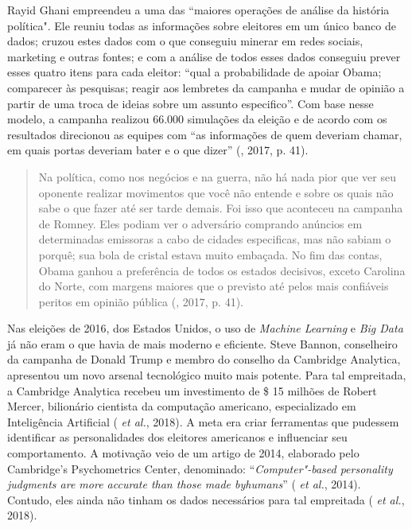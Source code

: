 Rayid Ghani empreendeu a uma das ``maiores operações de análise da
história política". Ele reuniu todas as informações sobre eleitores em
um único banco de dados; cruzou estes dados com o que conseguiu minerar
em redes sociais, marketing e outras fontes; e com a análise de todos
esses dados conseguiu prever esses quatro itens para cada eleitor:
``qual a probabilidade de apoiar Obama; comparecer às pesquisas; reagir
aos lembretes da campanha e mudar de opinião a partir de uma troca de
ideias sobre um assunto especifico''. Com base nesse modelo, a campanha
realizou 66.000 simulações da eleição e de acordo com os resultados
direcionou as equipes com ``as informações de quem deveriam chamar, em
quais portas deveriam bater e o que dizer'' (, 2017, p. 41).

\begin{quote}
Na política, como nos negócios e na guerra, não há nada pior que ver seu
oponente realizar movimentos que você não entende e sobre os quais não
sabe o que fazer até ser tarde demais. Foi isso que aconteceu na
campanha de Romney. Eles podiam ver o adversário comprando anúncios em
determinadas emissoras a cabo de cidades especificas, mas não sabiam o
porquê; sua bola de cristal estava muito embaçada. No fim das contas,
Obama ganhou a preferência de todos os estados decisivos, exceto
Carolina do Norte, com margens maiores que o previsto até pelos mais
confiáveis peritos em opinião pública (, 2017, p. 41).
\end{quote}

Nas eleições de 2016, dos Estados Unidos, o uso de \emph{Machine
Learning} e \emph{Big Data} já não eram o que havia de mais moderno e
eficiente. Steve Bannon, conselheiro da campanha de Donald Trump e
membro do conselho da Cambridge Analytica, apresentou um novo arsenal
tecnológico muito mais potente. Para tal empreitada, a Cambridge
Analytica recebeu um investimento de \$ 15 milhões de Robert Mercer,
bilionário cientista da computação americano, especializado em
Inteligência Artificial ( \emph{et al.}, 2018). A meta era criar
ferramentas que pudessem identificar as personalidades dos eleitores
americanos e influenciar seu comportamento. A motivação veio de um
artigo de 2014, elaborado pelo Cambridge's Psychometrics Center,
denominado: ``\emph{Computer"-based personality judgments are more
accurate than those made byhumans}'' ( \emph{et al.}, 2014). Contudo, eles
ainda não tinham os dados necessários para tal empreitada ( \emph{et
al.}, 2018).

